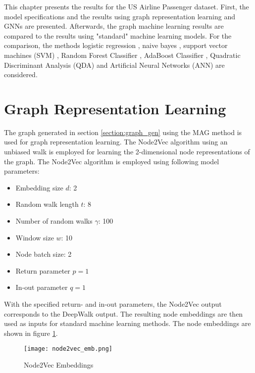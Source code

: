   
  This chapter presents the results for the US Airline Passenger dataset. First, 
  the model specifications and the results using graph representation learning 
  and GNNs are presented. Afterwards, the graph machine learning results are 
  compared to the results using "standard" machine learning models. For the 
  comparison, the methods logistic regression \citep{cramer2002origins}, naive 
  bayes \citep{zhang2004bayes}, support vector machines (SVM) 
  \citep{platt1999probabilistic,chang2011libsvm}, Random Forest Classifier 
  \citep{breiman2001random}, AdaBoost Classifier 
  \citep{freund1997decision,hastie2009multi}, Quadratic Discriminant Analysis
  (QDA) \citep{tharwat2016linear} and Artificial Neural Networks (ANN)
  \citep{mcculloch1943logical} are considered.

  \section{Graph Representation Learning}
  \label{section:result_n2v}

  The graph generated in section \ref{section:graph_gen} using the MAG method
  is used for graph representation learning. The Node2Vec algorithm using an
  unbiased walk is employed for learning the 2-dimensional node representations 
  of the graph. The Node2Vec algorithm is employed using following model 
  parameters:

  \begin{itemize}
    \setlength\itemsep{0.1em}
    \item Embedding size $d$: 2
    \item Random walk length $t$: 8
    \item Number of random walks $\gamma$: 100
    \item Window size $w$: 10
    \item Node batch size: 2
    \item Return parameter $p=1$
    \item In-out parameter $q=1$
  \end{itemize}

  \noindent With the specified return- and in-out parameters, the Node2Vec
  output corresponds to the DeepWalk output. The resulting node embeddings are
  then used as inputs for standard machine learning methods. The node embeddings 
  are shown in figure \ref{fig:node2vec}. 

  \begin{figure}[h]
		\centering
		\texttt{[image: node2vec\_emb.png]}
		\caption{Node2Vec Embeddings}
        \label{fig:node2vec}
  \end{figure}

